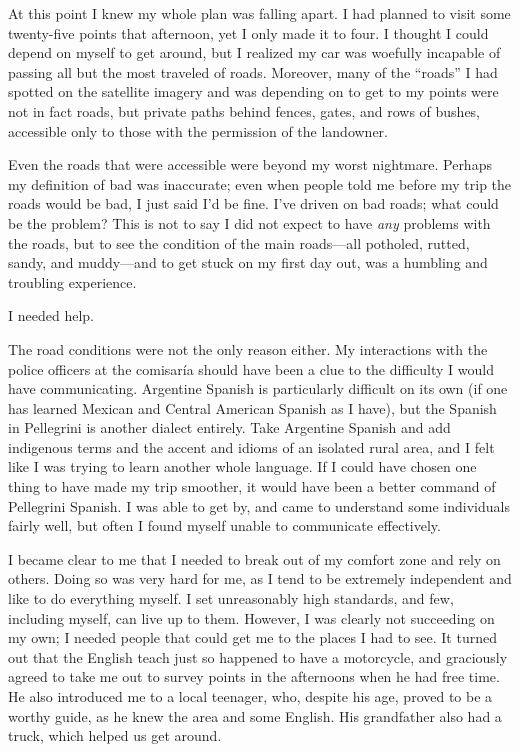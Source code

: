 At this point I knew my whole plan was falling apart. I had planned to visit some twenty-five points that afternoon, yet I only made it to four. I thought I could depend on myself to get around, but I realized my car was woefully incapable of passing all but the most traveled of roads. Moreover, many of the “roads” I had spotted on the satellite imagery and was depending on to get to my points were not in fact roads, but private paths behind fences, gates, and rows of bushes, accessible only to those with the permission of the landowner.

Even the roads that were accessible were beyond my worst nightmare. Perhaps my definition of bad was inaccurate; even when people told me before my trip the roads would be bad, I just said I’d be fine. I’ve driven on bad roads; what could be the problem? This is not to say I did not expect to have \textit{any} problems with the roads, but to see the condition of the main roads—all potholed, rutted, sandy, and muddy—and to get stuck on my first day out, was a humbling and troubling experience.

I needed help.

The road conditions were not the only reason either. My interactions with the police officers at the comisaría should have been a clue to the difficulty I would have communicating. Argentine Spanish is particularly difficult on its own (if one has learned Mexican and Central American Spanish as I have), but the Spanish in Pellegrini is another dialect entirely. Take Argentine Spanish and add indigenous terms and the accent and idioms of an isolated rural area, and I felt like I was trying to learn another whole language. If I could have chosen one thing to have made my trip smoother, it would have been a better command of Pellegrini Spanish. I was able to get by, and came to understand some individuals fairly well, but often I found myself unable to communicate effectively.

I became clear to me that I needed to break out of my comfort zone and rely on others. Doing so was very hard for me, as I tend to be extremely independent and like to do everything myself. I set unreasonably high standards, and few, including myself, can live up to them. However, I was clearly not succeeding on my own; I needed people that could get me to the places I had to see. It turned out that the English teach just so happened to have a motorcycle, and graciously agreed to take me out to survey points in the afternoons when he had free time. He also introduced me to a local teenager, who, despite his age, proved to be a worthy guide, as he knew the area and some English. His grandfather also had a truck, which helped us get around.

